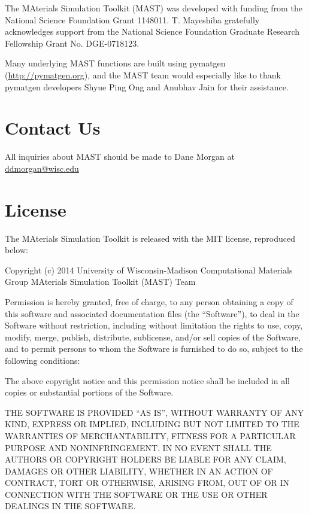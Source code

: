 \documentclass[letterpaper,10pt,english]{sphinxmanual}
\begin{document}
The MAterials Simulation Toolkit (MAST) was developed with funding from the National Science Foundation Grant 1148011. T. Mayeshiba gratefully acknowledges support from the National Science Foundation Graduate Research Fellowship Grant No. DGE-0718123.


Many underlying MAST functions are built using pymatgen (\href{http://pymatgen.org}{http://pymatgen.org}), and the MAST team would especially like to thank pymatgen developers Shyue Ping Ong and Anubhav Jain for their assistance.


\chapter{Contact Us}
\label{14_0_contact:contact-us}\label{14_0_contact::doc}
All inquiries about MAST should be made to Dane Morgan at \href{mailto:ddmorgan@wisc.edu}{ddmorgan@wisc.edu}


\chapter{License}
\label{11_0_license::doc}\label{11_0_license:license}
The MAterials Simulation Toolkit is released with the MIT license, reproduced below:

Copyright (c) 2014 University of Wisconsin-Madison Computational Materials Group MAterials Simulation Toolkit (MAST) Team

Permission is hereby granted, free of charge, to any person obtaining a copy
of this software and associated documentation files (the ``Software''), to deal
in the Software without restriction, including without limitation the rights
to use, copy, modify, merge, publish, distribute, sublicense, and/or sell
copies of the Software, and to permit persons to whom the Software is
furnished to do so, subject to the following conditions:

The above copyright notice and this permission notice shall be included in
all copies or substantial portions of the Software.

THE SOFTWARE IS PROVIDED ``AS IS'', WITHOUT WARRANTY OF ANY KIND, EXPRESS OR
IMPLIED, INCLUDING BUT NOT LIMITED TO THE WARRANTIES OF MERCHANTABILITY,
FITNESS FOR A PARTICULAR PURPOSE AND NONINFRINGEMENT. IN NO EVENT SHALL THE
AUTHORS OR COPYRIGHT HOLDERS BE LIABLE FOR ANY CLAIM, DAMAGES OR OTHER
LIABILITY, WHETHER IN AN ACTION OF CONTRACT, TORT OR OTHERWISE, ARISING FROM,
OUT OF OR IN CONNECTION WITH THE SOFTWARE OR THE USE OR OTHER DEALINGS IN
THE SOFTWARE.



\renewcommand{\indexname}{Index}
\printindex
\end{document}
